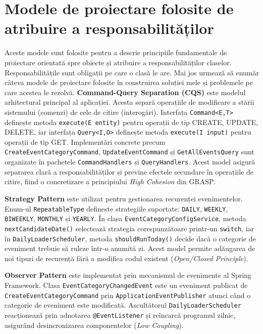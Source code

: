 \documentclass[a4paper,12pt,oneside]{report}
\begin{document}
    \section{Modele de proiectare folosite de atribuire a responsabilităților}
    Aceste modele sunt folosite pentru a descrie principiile fundamentale de proiectare orientată spre obiecte și atribuire a responsabilităților claselor. Responsabilitățile sunt obligații pe care o clasă le are.
    Mai jos urmează să enumăr câteva modele de proiectare folosite în construirea soluției mele și problemele pe care acestea le rezolvă.
    \newline
    \newline
    \textbf{Command-Query Separation (CQS)} \cite{puchianu_iss} este modelul arhitectural principal al aplicației. Acesta separă operațiile de modificare a stării sistemului (comenzi) de cele de citire (interogări). Interfața \texttt{Command<E,T>} definește metoda \texttt{execute(E entity)} pentru operații de tip CREATE, UPDATE, DELETE, iar interfața \texttt{Query<I,O>} definește metoda \newline \texttt{execute(I input)} pentru operații de tip GET. Implementări concrete precum \newline\texttt{CreateEventCategoryCommand}, \texttt{UpdateEventCommand} și \newline\texttt{GetAllEventsQuery} sunt organizate în pachetele \texttt{CommandHandlers} și \newline\texttt{QueryHandlers}. Acest model asigură separarea clară a responsabilităților și previne efectele secundare în operațiile de citire, fiind o concretizare a principiului \textit{High Cohesion} din GRASP.

    \textbf{Strategy Pattern} \cite{grand02} este utilizat pentru gestionarea recurenței evenimentelor. Enum-ul \texttt{RepeatableType} definește strategiile suportate: \texttt{DAILY}, \texttt{WEEKLY}, \texttt{BIWEEKLY}, \texttt{MONTHLY} și \texttt{YEARLY}. În clasa \texttt{EventCategoryConfigService}, metoda \texttt{nextCandidateDate()} selectează strategia corespunzătoare printr-un \texttt{switch}, iar în \texttt{DailyLoaderScheduler}, metoda \texttt{shouldRunToday()} decide dacă o categorie de eveniment trebuie să ruleze într-o anumită zi. Acest model permite adăugarea de noi tipuri de recurență fără a modifica codul existent (\textit{Open/Closed Principle}).

    \textbf{Observer Pattern} \cite{deinum12} este implementat prin mecanismul de evenimente al Spring Framework. Clasa \texttt{EventCategoryChangedEvent} este un eveniment publicat de 
    \newline
    \texttt{CreateEventCategoryCommand} prin \texttt{ApplicationEventPublisher} atunci când o categorie de eveniment este modificată. 
    \newline
    Ascultătorul \texttt{DailyLoaderScheduler} reacționează prin adnotarea \texttt{@EventListener} și reîncarcă programul zilnic, asigurând desincronizarea componentelor (\textit{Low Coupling}).
\end{document}
